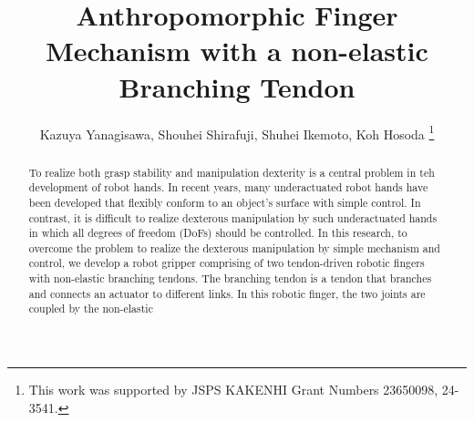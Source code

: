 \documentclass{llncs}
\begin{document}
\title{Anthropomorphic Finger Mechanism with a non-elastic Branching Tendon}
\author{Kazuya Yanagisawa, Shouhei Shirafuji, Shuhei Ikemoto, Koh Hosoda
\thanks{This work was supported by JSPS KAKENHI Grant Numbers 23650098, 24-3541.}}
\maketitle

\begin{abstract}
	To realize both grasp
	stability and manipulation dexterity is a central
	problem in teh development of robot hands.
	In recent years, many underactuated robot hands have been developed that
	flexibly conform to an object's surface with %
	simple control.
	In contrast, it is difficult to realize dexterous manipulation 
	by such underactuated hands in which
	all degrees of freedom (DoFs) should be controlled.
	In this research, to overcome the problem to realize the dexterous manipulation
	by simple mechanism and control,
	we develop a robot gripper comprising of two tendon-driven robotic fingers
	with non-elastic branching tendons.
	The branching tendon is a tendon that branches and connects an actuator
	to different links.
	In this robotic finger, the two joints are coupled by the non-elastic

\end{abstract}
\end{document}
